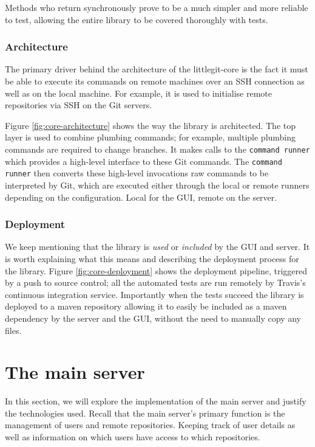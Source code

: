 Methods who return synchronously prove to be a much simpler and more reliable to test, allowing the entire library to be covered thoroughly with tests.

\subsubsection{Architecture}

The primary driver behind the architecture of the littlegit-core is the fact it must be able to execute its commands on remote machines over an SSH connection as well as on the local machine. For example, it is used to initialise remote repositories via SSH on the Git servers.

Figure \ref{fig:core-architecture} shows the way the library is architected. The top layer is used to combine plumbing commands; for example, multiple plumbing commands are required to change branches. It makes calls to the \texttt{command runner} which provides a high-level interface to these Git commands. The  \texttt{command runner} then converts these high-level invocations raw commands to be interpreted by Git, which are executed either through the local or remote runners depending on the configuration. Local for the GUI, remote on the server.



\subsubsection{Deployment}

We keep mentioning that the library is \emph{used} or \emph{included} by the GUI and server. It is worth explaining what this means and describing the deployment process for the library. Figure \ref{fig:core-deployment} shows the deployment pipeline, triggered by a push to source control; all the automated tests are run remotely by Travis's continuous integration service. Importantly when the tests succeed the library is deployed to a maven repository allowing it to easily be included as a maven dependency by the server and the GUI, without the need to manually copy any files.


\section{The main server}
In this section, we will explore the implementation of the main server and justify the technologies used. Recall that the main server's primary function is the management of users and remote repositories. Keeping track of user details as well as information on which users have access to which repositories. 

